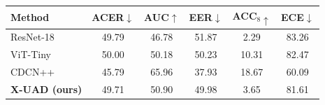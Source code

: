 \begin{tabular}{lccccc}
\toprule
Method & ACER$\downarrow$ & AUC$\uparrow$ & EER$\downarrow$ & ACC$_8\uparrow$ & ECE$\downarrow$ \\
\midrule
ResNet-18~\cite{he2016resnet} & 49.79 & 46.78 & 51.87 & 2.29 & 83.26 \\
ViT-Tiny~\cite{dosovitskiy2021vit} & 50.00 & 50.18 & 50.23 & 10.31 & 82.47 \\
CDCN++~\cite{yu2020cdcn} & 45.79 & 65.96 & 37.93 & 18.67 & 60.09 \\
\textbf{X-UAD (ours)} & 49.71 & 50.90 & 49.98 & 3.65 & 81.61 \\
\bottomrule
\end{tabular}